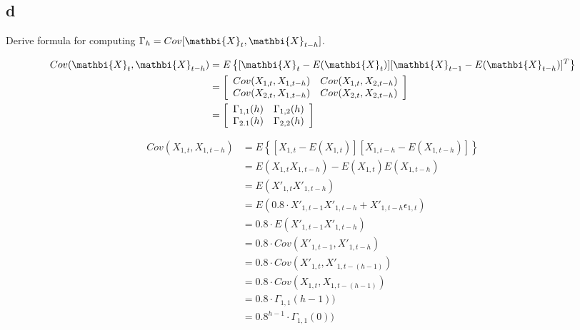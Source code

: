 \subsection{d} 
\label{section_1_d}
Derive formula for computing $\Gamma_h = Cov[\mathbi{X}_t,\mathbi{X}_{t-h}]$.

\begin{solution}

\begin{equation}
\begin{aligned}
Cov(\mathbi{X}_t,\mathbi{X}_{t-h}) & = E\left\{[\mathbi{X}_t-E(\mathbi{X}_t)][\mathbi{X}_{t-1}-E(\mathbi{X}_{t-h})]^T\right\} \\
									                 & =\left[\begin{array}{cc} Cov(X_{1,t},X_{1,t-h}) & Cov(X_{1,t},X_{2,t-h}) \\ Cov(X_{2,t},X_{1,t-h}) & Cov(X_{2,t},X_{2,t-h}) \end{array}\right] \\
																	 & =\left[\begin{array}{cc} \Gamma_{1,1}(h) & \Gamma_{1,2}(h)  \\ \Gamma_{2.1}(h)  & \Gamma_{2,2}(h)  \end{array}\right] \\
\end{aligned}
\end{equation}

\begin{equation}
\begin{aligned}
Cov(X_{1,t},X_{1,t-h}) 	& = E\left\{[X_{1,t} - E(X_{1,t})][X_{1,t-h} - E(X_{1,t-h})]\right\} \\
												& = E(X_{1,t}X_{1,t-h}) - E(X_{1,t})E(X_{1,t-h}) \\
												& = E(X'_{1,t}X'_{1,t-h})\\
												& = E\left(0.8 \cdot X'_{1,t-1}X'_{1,t-h} +  X'_{1,t-h}\epsilon_{1,t} \right)\\
												& = 0.8 \cdot E(X'_{1,t-1}X'_{1,t-h}) \\
												& = 0.8 \cdot Cov(X'_{1,t-1},X'_{1,t-h}) \\
												& = 0.8 \cdot Cov(X'_{1,t},X'_{1,t-(h-1)}) \\
												& = 0.8 \cdot Cov(X_{1,t},X_{1,t-(h-1)}) \\
												& = 0.8 \cdot \Gamma_{1,1}(h-1)) \\
												& = 0.8^{h-1} \cdot \Gamma_{1,1}(0)) \\
\end{aligned}
\end{equation}


\end{solution}
